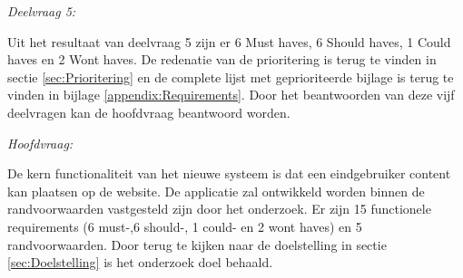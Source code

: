 \begin{center}
	\textit{Deelvraag 5: \SubquestionFive}
\end{center}

\whitespace
Uit het resultaat van deelvraag 5 zijn er 6 Must haves, 6 Should haves, 1 Could haves en 2 Wont haves.
De redenatie van de prioritering is terug te vinden in sectie \ref{sec:Prioritering} en de complete lijst met geprioriteerde bijlage is terug te vinden in bijlage \ref{appendix:Requirements}.
Door het beantwoorden van deze vijf deelvragen kan de hoofdvraag beantwoord worden.

\begin{center}
	\textit{Hoofdvraag: \MainQuestion}
\end{center}

\whitespace
De kern functionaliteit van het nieuwe systeem is dat een eindgebruiker content kan plaatsen op de website.
De applicatie zal ontwikkeld worden binnen de randvoorwaarden vastgesteld zijn door het onderzoek.
Er zijn 15 functionele requirements (6 must-,6 should-, 1 could- en 2 wont haves) en 5 randvoorwaarden.
Door terug te kijken naar de doelstelling in sectie \ref{sec:Doelstelling} is het onderzoek doel behaald.

